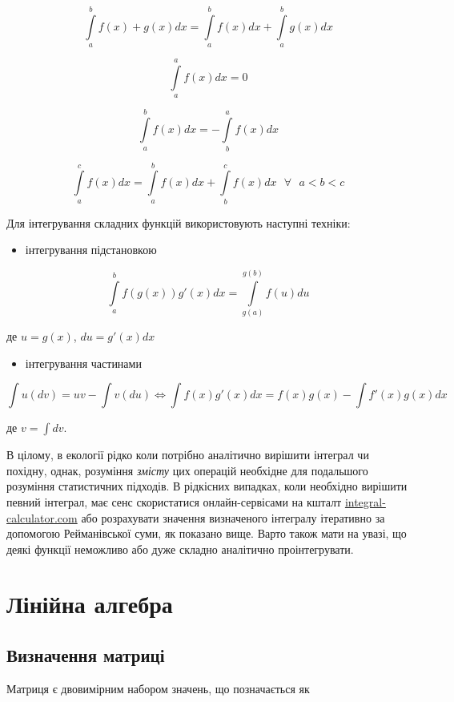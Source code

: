 \documentclass[
  11pt,
]{book}
\providecommand{\tightlist}{%
  \setlength{\itemsep}{0pt}\setlength{\parskip}{0pt}}
\begin{document}
\[\int \limits_a^b f(x) + g(x) dx = \int \limits_a^b f(x) dx + \int \limits_a^b g(x) dx\]

\[\int \limits_a^a f(x)dx = 0\]

\[\int \limits_a^b f(x)dx = -\int \limits_b^a f(x)dx\]

\[\int \limits_a^c f(x)dx = \int \limits_a^b f(x)dx + \int \limits_b^c f(x)dx \text{ } \forall \text{ } a < b < c\]

Для інтегрування складних функцій використовують наступні техніки:

\begin{itemize}
\tightlist
\item
  інтегрування підстановкою
\end{itemize}

\[\int \limits_a^b f(g(x)) g'(x)dx = \int \limits_{g(a)}^{g(b)} f(u) du\]

де \(u = g(x)\), \(du = g'(x)dx\)

\begin{itemize}
\tightlist
\item
  інтегрування частинами
\end{itemize}

\[\int u (dv) = uv - \int v (du) \iff \int f(x)g'(x)dx = f(x)g(x) - \int f'(x) g(x) dx\]

де \(v = \int dv\).

В цілому, в екології рідко коли потрібно аналітично вирішити інтеграл чи похідну, однак, розуміння \emph{змісту} цих операцій необхідне для подальшого розуміння статистичних підходів. В рідкісних випадках, коли необхідно вирішити певний інтеграл, має сенс скористатися онлайн-сервісами на кшталт \href{https://www.integral-calculator.com/}{integral-calculator.com} або розрахувати значення визначеного інтегралу ітеративно за допомогою Рейманівської суми, як показано вище. Варто також мати на увазі, що деякі функції неможливо або дуже складно аналітично проінтегрувати.

\section{Лінійна алгебра}\label{matrices}

\subsection{Визначення матриці}\label{ux432ux438ux437ux43dux430ux447ux435ux43dux43dux44f-ux43cux430ux442ux440ux438ux446ux456}

Матриця є двовимірним набором значень, що позначається як
\end{document}

